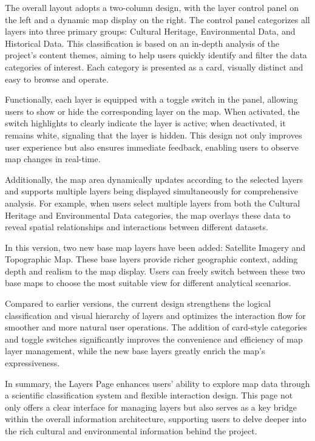 The overall layout adopts a two-column design, with the layer control panel on the left and a dynamic map display on the right. The control panel categorizes all layers into three primary groups: Cultural Heritage, Environmental Data, and Historical Data. This classification is based on an in-depth analysis of the project's content themes, aiming to help users quickly identify and filter the data categories of interest. Each category is presented as a card, visually distinct and easy to browse and operate.

Functionally, each layer is equipped with a toggle switch in the panel, allowing users to show or hide the corresponding layer on the map. When activated, the switch highlights to clearly indicate the layer is active; when deactivated, it remains white, signaling that the layer is hidden. This design not only improves user experience but also ensures immediate feedback, enabling users to observe map changes in real-time.

Additionally, the map area dynamically updates according to the selected layers and supports multiple layers being displayed simultaneously for comprehensive analysis. For example, when users select multiple layers from both the Cultural Heritage and Environmental Data categories, the map overlays these data to reveal spatial relationships and interactions between different datasets.

In this version, two new base map layers have been added: Satellite Imagery and Topographic Map. These base layers provide richer geographic context, adding depth and realism to the map display. Users can freely switch between these two base maps to choose the most suitable view for different analytical scenarios.

Compared to earlier versions, the current design strengthens the logical classification and visual hierarchy of layers and optimizes the interaction flow for smoother and more natural user operations. The addition of card-style categories and toggle switches significantly improves the convenience and efficiency of map layer management, while the new base layers greatly enrich the map's expressiveness.

In summary, the Layers Page enhances users' ability to explore map data through a scientific classification system and flexible interaction design. This page not only offers a clear interface for managing layers but also serves as a key bridge within the overall information architecture, supporting users to delve deeper into the rich cultural and environmental information behind the project.


